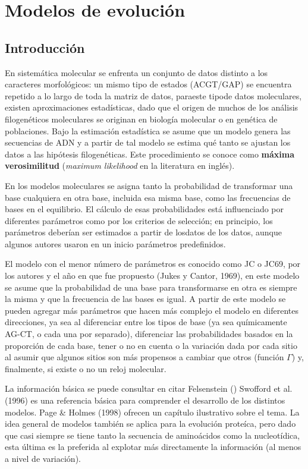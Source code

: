%
%
\chapter{Modelos de evoluci\'on}
\section*{Introducci\'on}
\label{ch:molecular}
En sistem\'atica molecular se enfrenta un conjunto de datos distinto  a los caracteres morfol\'ogicos:  un mismo tipo de estados (ACGT/GAP) se encuentra repetido a lo largo de toda la matriz de datos, paraeste tipode datos moleculares, existen aproximaciones estad\'isticas, dado que el origen de muchos de los an\'alisis filogen\'eticos moleculares se originan en biolog\'ia molecular o en gen\'etica de poblaciones. Bajo la estimaci\'on estad\'istica se asume que un modelo genera las secuencias de ADN y a partir de tal modelo se estima qu\'e tanto se ajustan los datos a las hip\'otesis filogen\'eticas. Este procedimiento se conoce como \textbf{m\'axima verosimilitud} (\textit{maximum likelihood} en la literatura en ingl\'es).

En los modelos moleculares se asigna tanto la probabilidad de transformar una base cualquiera en otra base, incluida esa misma base, como las frecuencias de bases en el equilibrio. El c\'alculo de esas probabilidades est\'a influenciado por diferentes par\'ametros como por los criterios de selecci\'on; en principio, los par\'ametros deber\'ian ser estimados a partir de losdatos de los datos, aunque algunos autores usaron en un inicio par\'ametros predefinidos.

El modelo con el menor n\'umero de par\'ametros es conocido como JC o JC69, por los autores y el a\~no en que fue propuesto (Jukes y Cantor, 1969), en este modelo se asume que la probabilidad de una base para transformarse en otra es siempre la misma y que la frecuencia de las bases es igual. A partir de este modelo se pueden agregar m\'as par\'ametros que hacen m\'as complejo el modelo en diferentes direcciones, ya sea al diferenciar entre los tipos de base (ya sea qu\'imicamente AG-CT, o cada una por separado), diferenciar las probabilidades basados en la proporci\'on de cada base, tener o no en cuenta o la variaci\'on dada por cada sitio al asumir que algunos sitios son m\'as propensos a cambiar que otros (funci\'on $\Gamma$) y, finalmente, si existe o no un reloj molecular.

La informaci\'on b\'asica se puede consultar en citar Felsenstein () %
Swofford et al. (1996) es una referencia b\'asica para comprender el desarrollo de los distintos modelos. Page \& Holmes (1998) ofrecen un cap\'itulo ilustrativo sobre el tema. La idea general de modelos tambi\'en se aplica para la evoluci\'on prote\'ica, pero dado que casi siempre se tiene tanto la secuencia de amino\'acidos como la nucleot\'idica, esta \'ultima es la preferida al explotar m\'as directamente la informaci\'on (al menos a nivel de variaci\'on).

